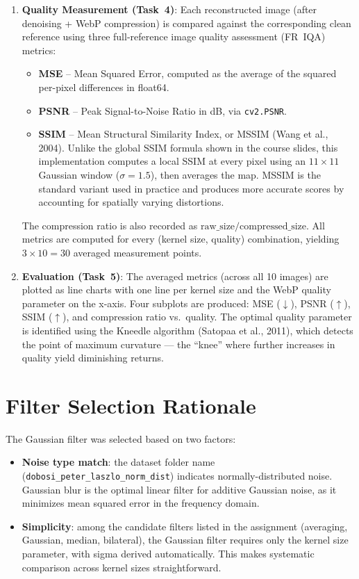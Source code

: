\documentclass[11pt,a4paper]{article}
\begin{document}
\begin{enumerate}[leftmargin=*]
    \item \textbf{Quality Measurement (Task~4)}:
        Each reconstructed image (after denoising + WebP compression) is compared against the corresponding clean reference using three full-reference image quality assessment (FR~IQA) metrics:
        \begin{itemize}[leftmargin=1.5em]
            \item \textbf{MSE} -- Mean Squared Error, computed as the average of the squared per-pixel differences in float64.
            \item \textbf{PSNR} -- Peak Signal-to-Noise Ratio in dB, via \texttt{cv2.PSNR}.
            \item \textbf{SSIM} -- Mean Structural Similarity Index, or MSSIM (Wang et al., 2004).
                Unlike the global SSIM formula shown in the course slides, this implementation computes a local SSIM at every pixel using an $11\times11$ Gaussian window ($\sigma=1.5$), then averages the map.
                MSSIM is the standard variant used in practice and produces more accurate scores by accounting for spatially varying distortions.
        \end{itemize}
        The compression ratio is also recorded as $\text{raw\_size} / \text{compressed\_size}$.
        All metrics are computed for every (kernel size, quality) combination, yielding $3 \times 10 = 30$ averaged measurement points.

    \item \textbf{Evaluation (Task~5)}:
        The averaged metrics (across all 10 images) are plotted as line charts with one line per kernel size and the WebP quality parameter on the x-axis.
        Four subplots are produced: MSE ($\downarrow$), PSNR ($\uparrow$), SSIM ($\uparrow$), and compression ratio vs.\ quality.
        The optimal quality parameter is identified using the Kneedle algorithm (Satopaa et al., 2011), which detects the point of maximum curvature --- the ``knee'' where further increases in quality yield diminishing returns.
\end{enumerate}

\section*{Filter Selection Rationale}
The Gaussian filter was selected based on two factors:
\begin{itemize}[leftmargin=*]
    \item \textbf{Noise type match}: the dataset folder name (\texttt{dobosi\_peter\_laszlo\_norm\_dist}) indicates normally-distributed noise.
        Gaussian blur is the optimal linear filter for additive Gaussian noise, as it minimizes mean squared error in the frequency domain.
    \item \textbf{Simplicity}: among the candidate filters listed in the assignment (averaging, Gaussian, median, bilateral), the Gaussian filter requires only the kernel size parameter, with sigma derived automatically.
        This makes systematic comparison across kernel sizes straightforward.
\end{itemize}
\end{document}
